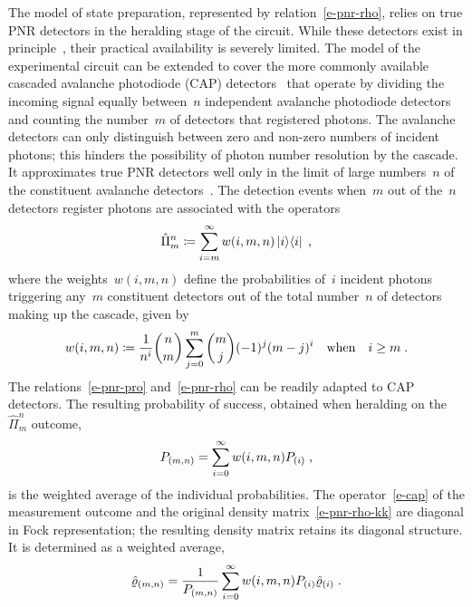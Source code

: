 \documentclass{optica-article}
\begin{document}
The model of state preparation, represented by relation~\eqref{e-pnr-rho}, relies on true PNR detectors in the heralding stage of the circuit. While these detectors exist in principle~\cite{hopker2019,endo2021,endo2025a}, their practical availability is severely limited. The model of the experimental circuit can be extended to cover the more commonly available cascaded avalanche photodiode (CAP) detectors~\cite{hlousek2019,grygar2022,hlousek2024,ercolano2024} that operate by dividing the incoming signal equally between~$n$ independent avalanche photodiode detectors and counting the number~$m$ of detectors that registered photons. The avalanche detectors can only distinguish between zero and non-zero numbers of incident photons; this hinders the possibility of photon number resolution by the cascade. It approximates true PNR detectors well only in the limit of large numbers~$n$ of the constituent avalanche detectors~\cite{provaznik2020}. The detection events when~$m$ out of the~$n$ detectors register photons are associated with the operators~\cite{paul1996}
%
\begin{equation}\label{e-cap}
  \hat{\Pi}_{m}^{n} 
    \coloneqq \sum_{i = m}^{\infty} w(i, m, n) \ketbra{i}{i} \Qc
\end{equation}
%
where the weights~$w(i, m, n)$ define the probabilities of~$i$ incident photons triggering any~$m$ constituent detectors out of the total number~$n$ of detectors making up the cascade, given by
%
\begin{equation}\label{e-cap-w}
  w(i, m, n) \coloneqq 
    \frac{1}{n^{i}} \binom{n}{m} \sum_{j = 0}^{m} \binom{m}{j} (-1)^{j} (m - j)^{i} 
    \quad\text{when}\quad i \geq m \;\text{.}
\end{equation} 
%
The relations~\eqref{e-pnr-pro} and~\eqref{e-pnr-rho} can be readily adapted to CAP detectors. The resulting probability of success, obtained when heralding on the~$\hat{\Pi}_{m}^{n}$ outcome, 
%
\begin{equation}\label{e-cap-pro}
  P_{(m, n)} = \sum_{i = 0}^{\infty} w(i, m, n) P_{(i)} \;\text{,}
\end{equation}
%
is the weighted average of the individual probabilities. The operator~\eqref{e-cap} of the measurement outcome and the original density matrix~\eqref{e-pnr-rho-kk} are diagonal in Fock representation; the resulting density matrix retains its diagonal structure. It is determined as a weighted average,
%
\begin{equation}\label{e-cap-rho-kk}
  \hat{\varrho}_{(m, n)} =
    \frac{1}{ P_{(m,n)} }
    \sum_{i = 0}^{\infty} w(i, m, n) P_{(i)} \hat{\varrho}_{(i)}
  \;\text{.}
\end{equation}
\end{document}
